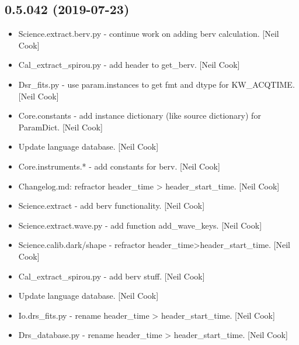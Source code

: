 \documentclass[a4paper,10pt,english]{report}
\begin{document}
\subsection{0.5.042 (2019-07-23)}
\label{\detokenize{misc/changelog:id98}}\begin{itemize}
\item {} 
Science.extract.berv.py - continue work on adding berv calculation.
{[}Neil Cook{]}

\item {} 
Cal\_extract\_spirou.py - add header to get\_berv. {[}Neil Cook{]}

\item {} 
Dsr\_fits.py - use param.instances to get fmt and dtype for KW\_ACQTIME.
{[}Neil Cook{]}

\item {} 
Core.constants - add instance dictionary (like source dictionary) for
ParamDict. {[}Neil Cook{]}

\item {} 
Update language database. {[}Neil Cook{]}

\item {} 
Core.instruments.* - add constants for berv. {[}Neil Cook{]}

\item {} 
Changelog.md: refractor header\_time \textendash{}\textgreater{} header\_start\_time. {[}Neil Cook{]}

\item {} 
Science.extract - add berv functionality. {[}Neil Cook{]}

\item {} 
Science.extract.wave.py - add function add\_wave\_keys. {[}Neil Cook{]}

\item {} 
Science.calib.dark/shape - refractor header\_time\textendash{}\textgreater{}header\_start\_time.
{[}Neil Cook{]}

\item {} 
Cal\_extract\_spirou.py - add berv stuff. {[}Neil Cook{]}

\item {} 
Update language database. {[}Neil Cook{]}

\item {} 
Io.drs\_fits.py - rename header\_time \textendash{}\textgreater{} header\_start\_time. {[}Neil Cook{]}

\item {} 
Drs\_database.py - rename header\_time \textendash{}\textgreater{} header\_start\_time. {[}Neil
Cook{]}

\end{itemize}
\end{document}
